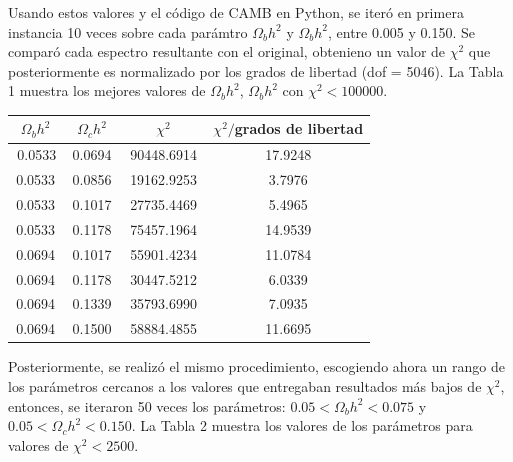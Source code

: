 \documentclass[twocolumn,letterpaper,spanish]{revtex4}
\numberwithin{equation}{section}
\begin{document}
Usando estos valores y el c\'odigo de CAMB en Python, se iter\'o en primera instancia 10 veces sobre cada par\'amtro $\Omega_b h^2$ y $\Omega_b h^2$, entre 0.005 y 0.150. Se compar\'o cada espectro resultante con el original, obtenieno un valor de $\chi^2$ que posteriormente es normalizado por los grados de libertad (dof = 5046). La Tabla 1 muestra los mejores valores de $\Omega_b h^2$, $\Omega_b h^2$ con $\chi^2<100000$. 

\begin{center}
\begin{tabular}{| c | c | c | c |}\hline
$\Omega_b h^2$ & $\Omega_c h^2$ & $\chi^2$ & $\chi^2/$grados de libertad    \\ \hline
	\,0.0533  & \,0.0694\,  &  \,90448.6914\,  &  17.9248 \\
	0.0533  & 0.0856  &  19162.9253  &  3.7976 \\
	0.0533  & 0.1017  &  27735.4469  &  5.4965 \\
	0.0533  & 0.1178  &  75457.1964  & 14.9539 \\
	0.0694  & 0.1017  &  55901.4234  & 11.0784 \\
	0.0694  & 0.1178  &  30447.5212  &  6.0339 \\
	0.0694  & 0.1339  &  35793.6990  &  7.0935 \\
	0.0694  & 0.1500  &  58884.4855  & 11.6695 \\ \hline
\end{tabular}\label{tabla1}
\end{center}

Posteriormente, se realiz\'o el mismo procedimiento, escogiendo ahora un rango de los par\'ametros cercanos a los valores que entregaban resultados m\'as bajos de $\chi^2$, entonces, se iteraron 50 veces los par\'ametros: $0.05<\Omega_b h^2< 0.075$ y $0.05<\Omega_c h^2<0.150$. La Tabla 2 muestra los valores de los par\'ametros para valores de $\chi^2<2500$.
\end{document}
